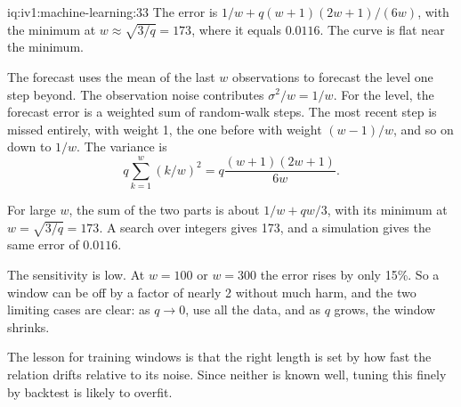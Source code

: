 \begin{solution}{iq:iv1:machine-learning:33}
The error is $1/w + q(w + 1)(2w + 1)/(6w)$, with the minimum at $w \approx \sqrt{3/q} = 173$, where it equals $0.0116$. The curve is flat near the minimum.

The forecast uses the mean of the last $w$ observations to forecast the level one step beyond. The observation noise contributes $\sigma^2/w = 1/w$. For the level, the forecast error is a weighted sum of random-walk steps. The most recent step is missed entirely, with weight 1, the one before with weight $(w - 1)/w$, and so on down to $1/w$. The variance is
\[
q\sum_{k = 1}^{w}(k/w)^2 = q\frac{(w + 1)(2w + 1)}{6w}.
\]

For large $w$, the sum of the two parts is about $1/w + qw/3$, with its minimum at $w = \sqrt{3/q} = 173$. A search over integers gives 173, and a simulation gives the same error of $0.0116$.

The sensitivity is low. At $w = 100$ or $w = 300$ the error rises by only 15\%. So a window can be off by a factor of nearly 2 without much harm, and the two limiting cases are clear: as $q \to 0$, use all the data, and as $q$ grows, the window shrinks.

The lesson for training windows is that the right length is set by how fast the relation drifts relative to its noise. Since neither is known well, tuning this finely by backtest is likely to overfit.



\end{solution}

